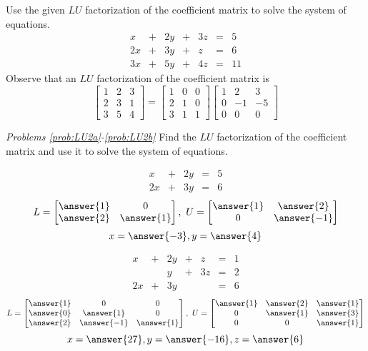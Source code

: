 \documentclass{ximera}
\author{Zack Reed}
\begin{document}
\begin{problem}\label{prob:LU1}
Use the given $LU$ factorization of the coefficient matrix to solve the system of equations.
$$\begin{array}{ccccccc}
      x & +&2y&+&3z&= &5 \\
     2x&+&3y&+&z&=&6\\
     3x& +&5y&+&4z&=&11
    \end{array}$$
Observe that an $LU$ factorization of the coefficient matrix is
\[
\begin{bmatrix}
1 & 2 & 3 \\
2 & 3 & 1 \\
3 & 5 & 4\end{bmatrix}
=
\begin{bmatrix}
1 & 0 & 0 \\
2 & 1 & 0 \\
3 & 1 & 1
\end{bmatrix}
\begin{bmatrix}
1 & 2 & 3 \\
0 & -1 & -5 \\
0 & 0 & 0
\end{bmatrix}
\]
\end{problem}
 
\emph{Problems \ref{prob:LU2a}-\ref{prob:LU2b}}
Find the $LU$ factorization of the coefficient matrix and use it to solve the system of equations.
 
\begin{problem}\label{prob:LU2a}
 
$$
\begin{array}{ccccc}
      x& +&2y&=&5\\
      2x & +&3y&= &6
    \end{array}
$$
$$L=\begin{bmatrix}\answer{1}&0\\\answer{2}&\answer{1}\end{bmatrix},\quad U=\begin{bmatrix}\answer{1}&\answer{2}\\0&\answer{-1}\end{bmatrix}$$
$$x=\answer{-3}, y=\answer{4}$$
\end{problem}
 
\begin{problem}\label{prob:LU2b}
$$\begin{array}{ccccccc}
      x & +&2y&+&z&= &1 \\
     & &y&+&3z&=&2\\
     2x& +&3y&&&=&6
    \end{array}$$
    $$L=\begin{bmatrix}\answer{1}&0&0\\\answer{0}&\answer{1}&0\\\answer{2}&\answer{-1}&\answer{1}\end{bmatrix},\quad U=\begin{bmatrix} \answer{1}&\answer{2}&\answer{1}\\0&\answer{1}&\answer{3}\\0&0&\answer{1}\end{bmatrix}$$
    $$x=\answer{27},y=\answer{-16}, z=\answer{6}$$
\end{problem}
 
\end{document}
